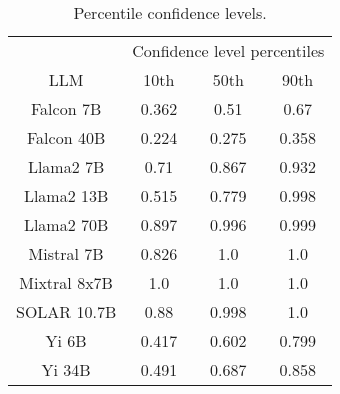 \begin{table*}
\centering
\begin{tabular}{c|c|c|c}
& \multicolumn{3}{c}{Confidence level percentiles} \\ 
LLM & 10th & 50th & 90th\\ \hline
Falcon 7B & 0.362 & 0.51 & 0.67\\
Falcon 40B & 0.224 & 0.275 & 0.358\\
Llama2 7B & 0.71 & 0.867 & 0.932\\
Llama2 13B & 0.515 & 0.779 & 0.998\\
Llama2 70B & 0.897 & 0.996 & 0.999\\
Mistral 7B & 0.826 & 1.0 & 1.0\\
Mixtral 8x7B & 1.0 & 1.0 & 1.0\\
SOLAR 10.7B & 0.88 & 0.998 & 1.0\\
Yi 6B & 0.417 & 0.602 & 0.799\\
Yi 34B & 0.491 & 0.687 & 0.858\\
\hline
\end{tabular}
\caption{Percentile confidence levels.}
\label{tab:percentile_conf}
\end{table*}
